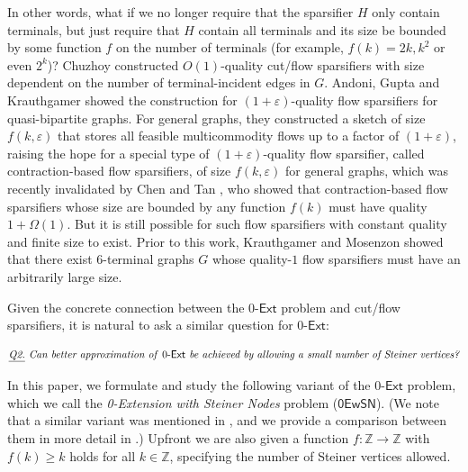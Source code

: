 \documentclass[11pt]{article}
\theoremstyle{definition}
\newcommand{\eps}{{\varepsilon}}
\newcounter{note}
\newcommand{\zesn}{\mathsf{0EwSN}}
\newcommand{\ze}{$0$-$\textsf{Ext}$\xspace}
\begin{document}
\begin{titlepage}
In other words, what if we no longer require that the sparsifier $H$ only contain terminals, but just require that $H$ contain all terminals and its size be bounded by some function $f$ on the number of terminals (for example, $f(k)=2k,k^2$ or even $2^k$)? 
Chuzhoy \cite{chuzhoy2012vertex} constructed $O(1)$-quality cut/flow sparsifiers with size dependent on the number of terminal-incident edges in $G$.
Andoni, Gupta and Krauthgamer \cite{andoni2014towards} showed the construction for $(1+\eps)$-quality flow sparsifiers for quasi-bipartite graphs. For general graphs, they constructed a sketch of size $f(k,\eps)$ that stores all feasible multicommodity flows up to a factor of $(1+\eps)$, raising the hope for a special type of $(1+\eps)$-quality flow sparsifier, called contraction-based flow sparsifiers, of size $f(k,\eps)$ for general graphs, which was recently invalidated by Chen and Tan \cite{chen20241+}, who showed that contraction-based flow sparsifiers whose size are bounded by any function $f(k)$ must have quality $1+\Omega(1)$. But it is still possible for such flow sparsifiers with constant quality and finite size to exist. Prior to this work, Krauthgamer and Mosenzon \cite{krauthgamer2023exact} showed that there exist $6$-terminal graphs $G$ whose quality-$1$ flow sparsifiers must have an arbitrarily large size.

Given the concrete connection between the \ze problem and  cut/flow sparsifiers, it is natural to ask a similar question for \ze: 

\vspace{-10pt}
\[\emph{\underline{Q2.} Can better approximation of \textnormal{\ze} be achieved by allowing a small number of Steiner vertices?}\]
\vspace{-10pt}

In this paper, we formulate and study the following variant of the \ze problem, which we call the \emph{0-Extension with Steiner Nodes} problem ($\zesn$). (We note that a similar variant was mentioned in \cite{andoni2014towards}, and we provide a comparison between them in more detail in .)
Upfront we are also given a function $f: \mathbb{Z}\to \mathbb{Z}$ with $f(k)\ge k$ holds for all $k\in \mathbb{Z}$, specifying the number of Steiner vertices allowed.

\vspace{-10pt}


\end{titlepage}
\end{document}
